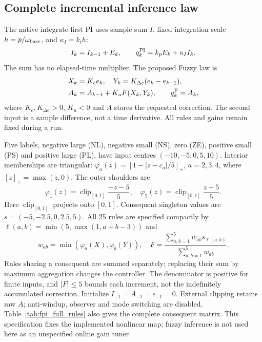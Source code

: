 \subsection{Complete incremental inference law}
The native integrate-first PI uses sample sum $I$, fixed integration
scale $h=p/\omega_{\rm base}$, and $\kappa_I=k_ih$:
\begin{equation}
 I_k=I_{k-1}+E_k,\qquad q_k^{\rm PI}=k_pE_k+\kappa_I I_k.
 \label{eq:fpi_native}
\end{equation}
The sum has no elapsed-time multiplier. The proposed Fuzzy law is
\begin{align}
 X_k&=K_e e_k,\quad Y_k=K_{\Delta e}(e_k-e_{k-1}),\nonumber\\
 A_k&=A_{k-1}+K_uF(X_k,Y_k),\qquad q_k^{\rm F}=A_k,
 \label{eq:fpi_fuzzy_law}
\end{align}
where $K_e,K_{\Delta e}>0$, $K_u<0$ and $A$ stores the requested
correction. The second input is a sample difference, not a time
derivative. All rules and gains remain fixed during a run.

Five labels, negative large (NL), negative small (NS), zero (ZE),
positive small (PS) and positive large (PL), have input centres
$(-10,-5,0,5,10)$. Interior memberships are triangular:
$\varphi_a(z)=[1-|z-c_a|/5]_+$, $a=2,3,4$, where
$[z]_+=\max(z,0)$. The outer shoulders are
\begin{equation}
 \varphi_1(z)=\operatorname{clip}_{[0,1]}\frac{-z-5}{5},\quad
 \varphi_5(z)=\operatorname{clip}_{[0,1]}\frac{z-5}{5}.
\end{equation}
Here $\operatorname{clip}_{[0,1]}$ projects onto $[0,1]$.
Consequent singleton values are $s=(-5,-2.5,0,2.5,5)$.
All 25 rules are specified compactly by
$\ell(a,b)=\min(5,\max(1,a+b-3))$ and
\begin{equation}
 w_{ab}=\min(\varphi_a(X),\varphi_b(Y)),\quad
 F=\frac{\sum_{a,b=1}^5w_{ab}s_{\ell(a,b)}}{\sum_{a,b=1}^5w_{ab}}.
 \label{eq:fpi_rules}
\end{equation}
Rules sharing a consequent are summed separately; replacing their
sum by maximum aggregation changes the controller. The denominator
is positive for finite inputs, and $|F|\le5$ bounds each increment,
not the indefinitely accumulated correction. Initialize
$I_{-1}=A_{-1}=e_{-1}=0$. External clipping retains raw $A$;
anti-windup, observer and mode switching are disabled.
Table~\ref{tab:fpi_full_rules} also gives the complete consequent matrix.
This specification fixes the implemented nonlinear map; fuzzy inference
is not used here as an unspecified online gain tuner.

